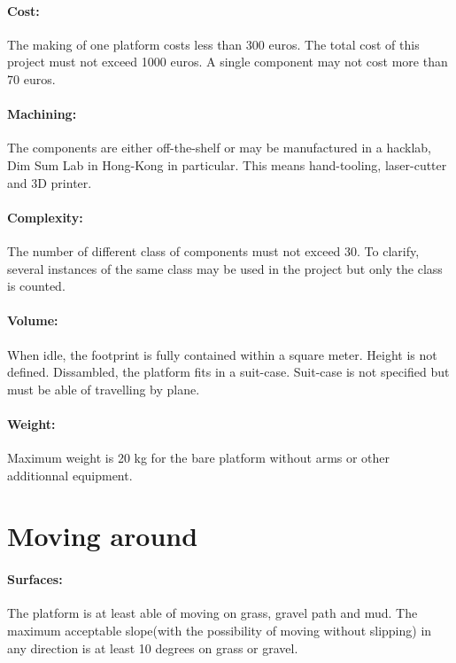 \documentclass[oneside, DIV=11]{scrreprt}
\begin{document}
    \paragraph{ Cost: } The making of one platform costs less than 300 euros. The total cost of this project must not exceed 1000 euros. A single component may not cost more than 70 euros.
    
    \paragraph{ Machining: } The components are either off-the-shelf or may be manufactured in a hacklab, Dim Sum Lab in Hong-Kong in particular. This means hand-tooling, laser-cutter and 3D printer.
    
    \paragraph{ Complexity: } The number of different class of components must not exceed 30. To clarify, several instances of the same class may be used in the project but only the class is counted.
    
    \paragraph{ Volume: } When idle, the footprint is fully contained within a square meter. Height is not defined. Dissambled, the platform fits in a suit-case. Suit-case is not specified but must be able of travelling by plane.
    
    \paragraph{ Weight: } Maximum weight is 20 kg for the bare platform without arms or other additionnal equipment.
    
\section{Moving around}

    \paragraph{Surfaces: } The platform is at least able of moving on grass, gravel path and mud. The maximum acceptable slope(with the possibility of moving without slipping) in any direction is at least 10 degrees on grass or gravel.
    
\end{document}
